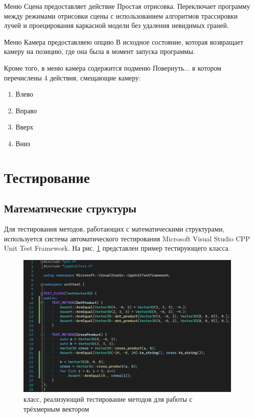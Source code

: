 \documentclass[a4paper, 14pt]{report} %
\begin{document}
	Меню Сцена предоставляет действие Простая отрисовка. Переключает программу между режимами отрисовки сцены с использованием алгоритмов трассировки лучей и проецирования каркасной модели без удаления невидимых граней.
	
	Меню Камера предоставляею опцию В исходное состояние, которая возвращает камеру на позицию, где она была в момент запуска программы.
	
	Кроме того, в меню камера содержится подменю Повернуть... в котором перечислены 4 действия, смещающие камеру:
	\begin{enumerate}
		\item Влево
		\item Вправо
		\item Вверх
		\item Вниз
	\end{enumerate}

	\section{Тестирование}
	\subsection{Математические структуры}
	Для тестирования методов, работающих с математическими структурами, используется система автоматического тестирования Microsoft Visual Studio CPP Unit Test Framework. На рис. \ref{fig:test_code} представлен пример тестирующего класса.
	
	\begin{figure}[ht]
		\centering
		\includegraphics[width=1\linewidth]{img/test_code}
		\caption{класс, реализующий тестирование методов для работы с трёхмерным вектором}
		\label{fig:test_code}
	\end{figure}
	
\end{document}
